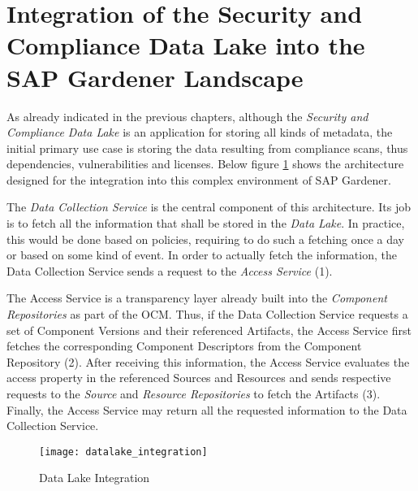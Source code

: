 \section{Integration of the Security and Compliance Data Lake into the SAP Gardener Landscape} \label{sec:Integration of the Security and Compliance Data Lake into the SAP Gardener Landscape}
As already indicated in the previous chapters, although the \emph{Security and Compliance Data Lake} is an application for storing all kinds of metadata, the initial primary use case is storing the data resulting from compliance scans, thus dependencies, vulnerabilities and licenses. Below figure \ref{fig:DataLakeIntegration} shows the architecture designed for the integration into this complex environment of SAP Gardener.\par 
The \emph{Data Collection Service} is the central component of this architecture. Its job is to fetch all the information that shall be stored in the \emph{Data Lake}. In practice, this would be done based on policies, requiring to do such a fetching once a day or based on some kind of event. In order to actually fetch the information, the Data Collection Service sends a request to the \emph{Access Service} (1).\par
The Access Service is a transparency layer already built into the \emph{Component Repositories} as part of the OCM. Thus, if the Data Collection Service requests a set of Component Versions and their referenced Artifacts, the Access Service first fetches the corresponding Component Descriptors from the Component Repository (2). After receiving this information, the Access Service evaluates the access property in the referenced Sources and Resources and sends respective requests to the \emph{Source} and \emph{Resource Repositories} to fetch the Artifacts (3). Finally, the Access Service may return all the requested information to the Data Collection Service.\par

\begin{figure}[H]
	\centering
	\texttt{[image: datalake\_integration]}
	\caption[Data Lake Integration]{Data Lake Integration }
	\label{fig:DataLakeIntegration}
\end{figure}

